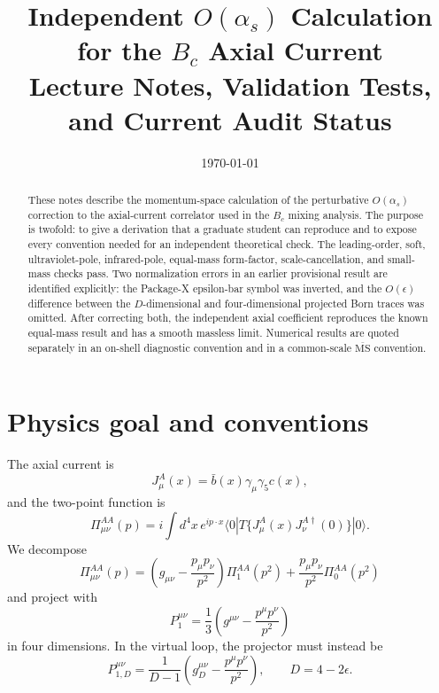 \documentclass[11pt]{article}
\title{Independent \(O(\alpha_s)\) Calculation for the \(B_c\) Axial Current\\
Lecture Notes, Validation Tests, and Current Audit Status}
\author{}
\date{\today}
\newcommand{\MSbar}{\overline{\mathrm{MS}}}
\begin{document}
\maketitle

\begin{abstract}
These notes describe the momentum-space calculation of the perturbative
\(O(\alpha_s)\) correction to the axial-current correlator used in the
\(B_c\) mixing analysis.  The purpose is twofold: to give a derivation that a
graduate student can reproduce and to expose every convention needed for an
independent theoretical check.  The leading-order, soft, ultraviolet-pole,
infrared-pole, equal-mass form-factor, scale-cancellation, and small-mass
checks pass.  Two normalization errors in an earlier provisional result are
identified explicitly: the Package-X epsilon-bar symbol was inverted, and
the \(O(\epsilon)\) difference between the \(D\)-dimensional and
four-dimensional projected Born traces was omitted.  After correcting both,
the independent axial coefficient reproduces the known equal-mass result and
has a smooth massless limit.  Numerical results are quoted separately in an
on-shell diagnostic convention and in a common-scale \(\MSbar\) convention.
\end{abstract}

\tableofcontents

\section{Physics goal and conventions}

The axial current is
\begin{equation}
 J_\mu^A(x)=\bar b(x)\gamma_\mu\gamma_5 c(x),
\end{equation}
and the two-point function is
\begin{equation}
 \Pi_{\mu\nu}^{AA}(p)
 =i\int d^4x\,e^{ip\cdot x}
 \langle0|T\{J_\mu^A(x)J_\nu^{A\dagger}(0)\}|0\rangle .
\end{equation}
We decompose
\begin{equation}
 \Pi_{\mu\nu}^{AA}(p)
 =\left(g_{\mu\nu}-\frac{p_\mu p_\nu}{p^2}\right)\Pi_1^{AA}(p^2)
 +\frac{p_\mu p_\nu}{p^2}\Pi_0^{AA}(p^2)
\end{equation}
and project with
\begin{equation}
 P_1^{\mu\nu}
 =\frac{1}{3}\left(g^{\mu\nu}-\frac{p^\mu p^\nu}{p^2}\right)
\end{equation}
in four dimensions.  In the virtual loop, the projector must instead be
\begin{equation}
 P_{1,D}^{\mu\nu}
 =\frac{1}{D-1}\left(g_D^{\mu\nu}
 -\frac{p^\mu p^\nu}{p^2}\right),\qquad D=4-2\epsilon .
\end{equation}
\end{document}
